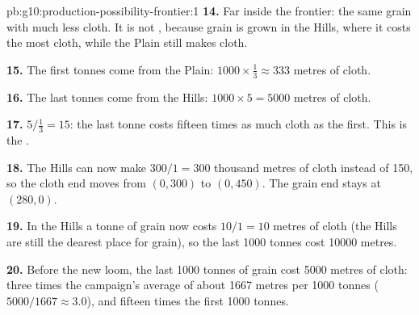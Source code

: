\begin{solution}{pb:g10:production-possibility-frontier:1}
\textbf{14.} Far inside the frontier: the same grain with much less cloth. It is not , because grain is grown in the Hills, where it costs the most cloth, while the Plain still makes
cloth.

\textbf{15.} The first tonnes come from the Plain: $1000 \times \tfrac13 \approx 333$ metres of cloth.

\textbf{16.} The last tonnes come from the Hills: $1000 \times 5 = 5000$ metres of cloth.

\textbf{17.} $5 / \tfrac13 = 15$: the last tonne costs fifteen times as much cloth as the first. This is the
.

\textbf{18.} The Hills can now make $300/1 = 300$ thousand metres of cloth instead of 150, so the cloth end
moves from $(0, 300)$ to $(0, 450)$. The grain end stays at $(280, 0)$.

\textbf{19.} In the Hills a tonne of grain now costs $10/1 = 10$ metres of cloth (the Hills are still the
dearest place for grain), so the last \num{1000} tonnes cost \num{10000} metres.

\textbf{20.} Before the new loom, the last \num{1000} tonnes of grain cost \num{5000} metres of cloth:
three times the campaign's average of about \num{1667} metres per \num{1000} tonnes ($5000/1667 \approx 3.0$),
and fifteen times the first \num{1000} tonnes.
\end{solution}
